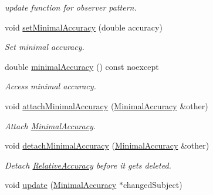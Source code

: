 \begin{DoxyCompactItemize}
\begin{DoxyCompactList}\small\item\em update function for observer pattern. \end{DoxyCompactList}\item 
void \hyperlink{classSpacy_1_1Mixin_1_1MinimalAccuracy_a34d3d3320bba45d5c6c06b65e2cc808b_a34d3d3320bba45d5c6c06b65e2cc808b}{set\+Minimal\+Accuracy} (double accuracy)
\begin{DoxyCompactList}\small\item\em Set minimal accuracy. \end{DoxyCompactList}\item 
double \hyperlink{classSpacy_1_1Mixin_1_1MinimalAccuracy_ab9e4346b7070ce179593fc38d556705b_ab9e4346b7070ce179593fc38d556705b}{minimal\+Accuracy} () const noexcept
\begin{DoxyCompactList}\small\item\em Access minimal accuracy. \end{DoxyCompactList}\item 
void \hyperlink{classSpacy_1_1Mixin_1_1MinimalAccuracy_a0b2039bf970afdb0ede9999d6567f49b_a0b2039bf970afdb0ede9999d6567f49b}{attach\+Minimal\+Accuracy} (\hyperlink{classSpacy_1_1Mixin_1_1MinimalAccuracy_a9dc80f566f27efbd48c43c7f7c0961c2_a9dc80f566f27efbd48c43c7f7c0961c2}{Minimal\+Accuracy} \&other)
\begin{DoxyCompactList}\small\item\em Attach \hyperlink{classSpacy_1_1Mixin_1_1MinimalAccuracy}{Minimal\+Accuracy}. \end{DoxyCompactList}\item 
\hypertarget{classSpacy_1_1Mixin_1_1MinimalAccuracy_adb422b74482cdef5ffaff816da86b18d}{}void \hyperlink{classSpacy_1_1Mixin_1_1MinimalAccuracy_adb422b74482cdef5ffaff816da86b18d}{detach\+Minimal\+Accuracy} (\hyperlink{classSpacy_1_1Mixin_1_1MinimalAccuracy_a9dc80f566f27efbd48c43c7f7c0961c2_a9dc80f566f27efbd48c43c7f7c0961c2}{Minimal\+Accuracy} \&other)\label{classSpacy_1_1Mixin_1_1MinimalAccuracy_adb422b74482cdef5ffaff816da86b18d}

\begin{DoxyCompactList}\small\item\em Detach \hyperlink{classSpacy_1_1Mixin_1_1RelativeAccuracy}{Relative\+Accuracy} before it gets deleted. \end{DoxyCompactList}\item 
\hypertarget{classSpacy_1_1Mixin_1_1MinimalAccuracy_a98dc7eb03f50165f6f2e0df17c2b7d44}{}void \hyperlink{classSpacy_1_1Mixin_1_1MinimalAccuracy_a98dc7eb03f50165f6f2e0df17c2b7d44}{update} (\hyperlink{classSpacy_1_1Mixin_1_1MinimalAccuracy_a9dc80f566f27efbd48c43c7f7c0961c2_a9dc80f566f27efbd48c43c7f7c0961c2}{Minimal\+Accuracy} $\ast$changed\+Subject)\label{classSpacy_1_1Mixin_1_1MinimalAccuracy_a98dc7eb03f50165f6f2e0df17c2b7d44}


\end{DoxyCompactItemize}
